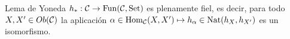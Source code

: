 \documentclass[twoside]{article}
\begin{document}
\begin{solucion}

\end{solucion}
%
%
\begin{ejercicio}{Lema de Yoneda}
$h_*:{\mathcal C}\to \mathrm{Fun}({\mathcal C}, \mathrm{Set})$ es plenamente fiel, es decir, para todo $X,X'\in Ob({\mathcal C})$ la aplicación $\alpha\in\operatorname{Hom}_{{\mathcal C}}(X,X')\mapsto h_{\alpha}\in \mathrm{Nat}(h_X,h_{X'})$ es un isomorfismo. 
\end{ejercicio}
\begin{solucion}
%
%
%
\end{solucion}
%
%
%
%
\end{document}
